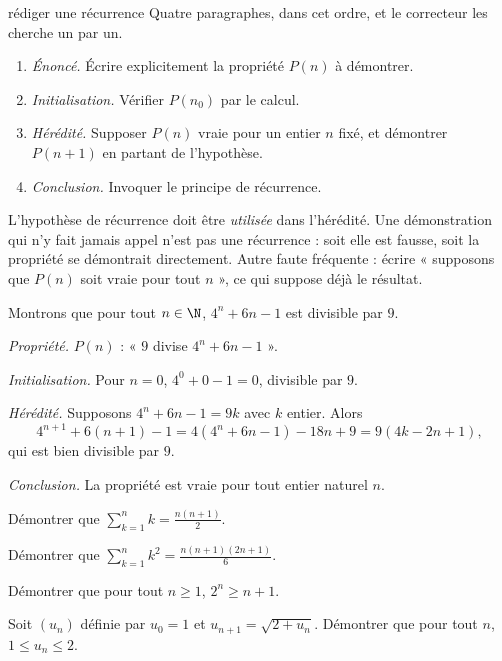 \begin{methode}{rédiger une récurrence}
Quatre paragraphes, dans cet ordre, et le correcteur les cherche un par un.
\begin{enumerate}[label=\textbf{\arabic*.}, leftmargin=*, itemsep=0.15em]
  \item \emph{Énoncé.} Écrire explicitement la propriété $P(n)$ à démontrer.
  \item \emph{Initialisation.} Vérifier $P(n_{0})$ par le calcul.
  \item \emph{Hérédité.} Supposer $P(n)$ vraie pour un entier $n$ fixé, et
        démontrer $P(n+1)$ en partant de l'hypothèse.
  \item \emph{Conclusion.} Invoquer le principe de récurrence.
\end{enumerate}
\end{methode}

\begin{avertissement}
L'hypothèse de récurrence doit être \emph{utilisée} dans l'hérédité. Une
démonstration qui n'y fait jamais appel n'est pas une récurrence : soit elle
est fausse, soit la propriété se démontrait directement. Autre faute
fréquente : écrire « supposons que $P(n)$ soit vraie pour tout $n$ », ce qui
suppose déjà le résultat.
\end{avertissement}

\begin{exemple}
Montrons que pour tout $n \in \N$, $4^{n}+6n-1$ est divisible par $9$.

\emph{Propriété.} $P(n)$ : « $9$ divise $4^{n}+6n-1$ ».

\emph{Initialisation.} Pour $n = 0$, $4^{0}+0-1 = 0$, divisible par $9$.

\emph{Hérédité.} Supposons $4^{n}+6n-1 = 9k$ avec $k$ entier. Alors
\[
  4^{n+1}+6(n+1)-1 = 4\left(4^{n}+6n-1\right)-18n+9
  = 9\left(4k-2n+1\right),
\]
qui est bien divisible par $9$.

\emph{Conclusion.} La propriété est vraie pour tout entier naturel $n$.
\end{exemple}

\begin{entrainement}[récurrence]
\exo[\niveau{1}] Démontrer que $\displaystyle\sum_{k=1}^{n}k
= \frac{n(n+1)}{2}$.

\exo[\niveau{2}] Démontrer que $\displaystyle\sum_{k=1}^{n}k^{2}
= \frac{n(n+1)(2n+1)}{6}$.

\exo[\niveau{2}] Démontrer que pour tout $n \geq 1$, $2^{n} \geq n+1$.

\exo[\niveau{3}] Soit $(u_{n})$ définie par $u_{0} = 1$ et
$u_{n+1} = \sqrt{2+u_{n}}$. Démontrer que pour tout $n$,
$1 \leq u_{n} \leq 2$.
\end{entrainement}

